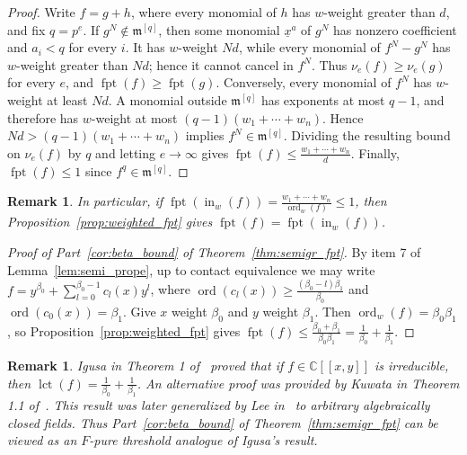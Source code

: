 \documentclass{article}
\newtheorem{remark}[theorem]{Remark}
\DeclareMathOperator{\ord}{ord}
\DeclareMathOperator{\fpt}{fpt}
\DeclareMathOperator{\lct}{lct}
\numberwithin{theorem}{section}
\begin{document}
\begin{proof}
Write $f=g+h$, where every monomial of $h$ has $w$-weight greater than $d$, and fix $q=p^e$. If $g^N\notin\mathfrak{m}^{[q]}$, then some monomial $\underline{x}^a$ of $g^N$ has nonzero coefficient and $a_i<q$ for every $i$. It has $w$-weight $Nd$, while every monomial of $f^N-g^N$ has $w$-weight greater than $Nd$; hence it cannot cancel in $f^N$. Thus $\nu_e(f)\geq\nu_e(g)$ for every $e$, and $\fpt(f)\geq\fpt(g)$. Conversely, every monomial of $f^N$ has $w$-weight at least $Nd$. A monomial outside $\mathfrak{m}^{[q]}$ has exponents at most $q-1$, and therefore has $w$-weight at most $(q-1)(w_1+\cdots+w_n)$. Hence $Nd>(q-1)(w_1+\cdots+w_n)$ implies $f^N\in\mathfrak{m}^{[q]}$. Dividing the resulting bound on $\nu_e(f)$ by $q$ and letting $e\to\infty$ gives $\fpt(f)\leq \frac{w_1+\cdots+w_n}{d}$. Finally, $\fpt(f)\leq1$ since $f^q\in\mathfrak{m}^{[q]}$.
\end{proof}

\begin{remark}\label{rem:weighted_equality}
\textup{In particular, if $\fpt(\operatorname{in}_w(f))=\frac{w_1+\cdots+w_n}{\ord_w(f)}\leq1$, then Proposition~\ref{prop:weighted_fpt} gives $\fpt(f)=\fpt(\operatorname{in}_w(f))$.}
\end{remark}

\begin{proof}[Proof of Part~\ref{cor:beta_bound} of Theorem~\ref{thm:semigr_fpt}]
By item 7 of Lemma~\ref{lem:semi_prope}, up to contact equivalence we may write $f=y^{\beta_0}+\sum_{l=0}^{\beta_0-1}c_l(x)y^l$, where $\ord(c_l(x))\geq\frac{(\beta_0-l)\beta_1}{\beta_0}$ and $\ord(c_0(x))=\beta_1$. Give $x$ weight $\beta_0$ and $y$ weight $\beta_1$. Then $\ord_w(f)=\beta_0\beta_1$, so Proposition~\ref{prop:weighted_fpt} gives $\fpt(f)\leq \frac{\beta_0+\beta_1}{\beta_0\beta_1}=\frac{1}{\beta_0}+\frac{1}{\beta_1}$.
\end{proof}

\begin{remark}\label{rem:igusa_lct}
\textup{Igusa in Theorem 1 of~\cite{igusa1977first} proved that if $f\in\mathbb{C}[[x,y]]$ is irreducible, then $\lct(f)=\frac{1}{\beta_0}+\frac{1}{\beta_1}$. An alternative proof was provided by Kuwata in Theorem 1.1 of~\cite{kuwata1999log}. This result was later generalized by Lee in~\cite{lee2026log} to arbitrary algebraically closed fields. Thus Part~\ref{cor:beta_bound} of Theorem~\ref{thm:semigr_fpt} can be viewed as an $F$-pure threshold analogue of Igusa's result.}
\end{remark}
\end{document}
